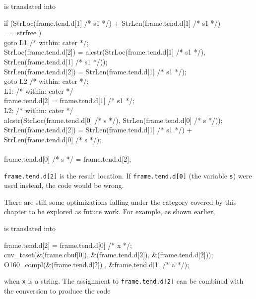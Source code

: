 
\noindent is translated into 

\goodbreak
\begin{iconcode}
\>if (StrLoc(frame.tend.d[1] /* s1 */) + StrLen(frame.tend.d[1] /* s1 */)\\
\>\>== strfree )\\
\>\>goto L1 /* within: cater */;\\
\>StrLoc(frame.tend.d[2]) = alcstr(StrLoc(frame.tend.d[1] /* s1 */),\\
\>\>StrLen(frame.tend.d[1] /* s1 */));\\
\>StrLen(frame.tend.d[2]) = StrLen(frame.tend.d[1] /* s1 */);\\
\>goto L2 /* within: cater */;\\
L1: /* within: cater */\\
\>frame.tend.d[2] = frame.tend.d[1] /* s1 */;\\
L2: /* within: cater */\\
\>alcstr(StrLoc(frame.tend.d[0] /* s */), StrLen(frame.tend.d[0] /* s */));\\
\>StrLen(frame.tend.d[2]) = StrLen(frame.tend.d[1] /* s1 */) +\\
\>\>StrLen(frame.tend.d[0] /* s */);\\
\\
\>frame.tend.d[0] /* s */ = frame.tend.d[2];\\
\end{iconcode}


\noindent \texttt{frame.tend.d[2]} is the result location. If
\texttt{frame.tend.d[0]} (the variable \texttt{s}) were used instead,
the code would be wrong.


There are still some optimizations falling under the category covered
by this chapter to be explored as future work. For example, as shown
earlier,


\noindent is translated into

\goodbreak
\begin{iconcode}
\>\>frame.tend.d[2] = frame.tend.d[0] /* x */;\\
\>\>cnv\_tcset(\&(frame.cbuf[0]), \&(frame.tend.d[2]), \&(frame.tend.d[2]));\\
\>\>O160\_compl(\&(frame.tend.d[2]) , \&frame.tend.d[1] /* a */);\\
\end{iconcode}

\noindent when \texttt{x} is a string. The assignment to
\texttt{frame.tend.d[2]} can be combined with the conversion to
produce the code

